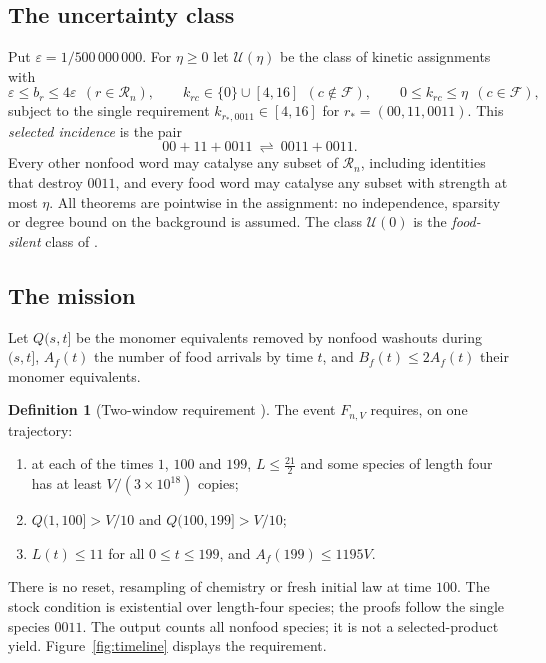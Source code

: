\documentclass[11pt,letterpaper]{article}
\theoremstyle{plain}
\theoremstyle{definition}
\newtheorem{definition}[theorem]{Definition}
\theoremstyle{remark}
\numberwithin{equation}{section}
\newcommand{\cR}{\mathcal R}
\newcommand{\cF}{\mathcal F}
\newcommand{\cU}{\mathcal U}
\newcommand{\eps}{\varepsilon}
\begin{document}
\subsection{The uncertainty class}
Put $\eps=1/500\,000\,000$. For $\eta\ge0$ let $\cU(\eta)$ be the class of kinetic assignments with
\begin{equation}\label{eq:box}
 \eps\le b_r\le4\eps\ \ (r\in\cR_n),\qquad k_{rc}\in\{0\}\cup[4,16]\ \ (c\notin\cF),\qquad 0\le k_{rc}\le\eta\ \ (c\in\cF),
\end{equation}
subject to the single requirement $k_{r_*,0011}\in[4,16]$ for $r_*=(00,11,0011)$. This \emph{selected incidence} is the pair
\begin{equation}\label{eq:selected}
 00+11+0011\ \rightleftharpoons\ 0011+0011 .
\end{equation}
Every other nonfood word may catalyse any subset of $\cR_n$, including identities that destroy $0011$, and every food word may catalyse any subset with strength at most $\eta$. All theorems are pointwise in the assignment: no independence, sparsity or degree bound on the background is assumed. The class $\cU(0)$ is the \emph{food-silent} class of \cite{twowindow2026}.

\subsection{The mission}
Let $Q(s,t]$ be the monomer equivalents removed by nonfood washouts during $(s,t]$, $A_f(t)$ the number of food arrivals by time $t$, and $B_f(t)\le2A_f(t)$ their monomer equivalents.

\begin{definition}[Two-window requirement \cite{twowindow2026}]\label{def:mission}
The event $F_{n,V}$ requires, on one trajectory:
\begin{enumerate}[label=(M\arabic*),leftmargin=3em]
\item at each of the times $1$, $100$ and $199$, $L\le\tfrac{21}{2}$ and some species of length four has at least $V/(3\times10^{18})$ copies;
\item $Q(1,100]>V/10$ and $Q(100,199]>V/10$;
\item $L(t)\le11$ for all $0\le t\le199$, and $A_f(199)\le1195V$.
\end{enumerate}
\end{definition}
There is no reset, resampling of chemistry or fresh initial law at time $100$. The stock condition is existential over length-four species; the proofs follow the single species $0011$. The output counts all nonfood species; it is not a selected-product yield. Figure~\ref{fig:timeline} displays the requirement.
\end{document}
